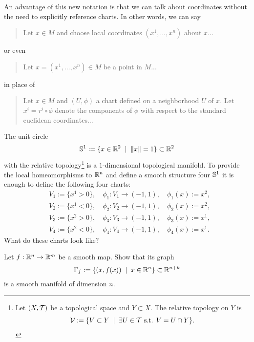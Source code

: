 An advantage of this new notation is that we can talk about coordinates without the need to explicitly reference charts. In other words, we can say
\begin{quote}
  Let $x\in M$ and choose local coordinates $(x^1, \ldots, x^n)$ about $x$...
\end{quote}
or even
\begin{quote}
  Let $x=(x^1, \ldots, x^n)\in M$ be a point in $M$...
\end{quote}
in place of
\begin{quote}
  Let $x \in M$ and $(U, \phi)$ a chart defined on a neighborhood $U$ of $x$. Let $x^i = r^i \circ\phi$ denote the components of $\phi$ with respect to the standard euclidean coordinates...
\end{quote}

\begin{ex}\label{ex:S1emb}
  The unit circle
  \begin{equation}
    \mathbb{S}^1 := \{x\in\mathbb{R}^2 \;\mid\; \|x\|=1\}\subset\mathbb{R}^2
  \end{equation}
  with the relative topology\footnote{Let $(X,\mathcal{T})$ be a topological space and $Y\subset X$. The relative topology on $Y$ is \begin{equation}\mathcal{V}:=\{V\subset Y\;\mid\;\exists U\in\mathcal{T} \mbox{ s.t. } V = U \cap Y\}.\end{equation}} is a $1$-dimensional topological manifold.
  To provide the local homeomorphisms to $\mathbb{R}^n$ and define a smooth structure four $\mathbb{S}^1$ it is enough to define the following four charts:
  \begin{equation}
    \begin{aligned}
      &V_1 := \{ x^1 > 0 \},\quad \phi_1: V_1 \to (-1, 1), \quad \phi_1(x) := x^2,\\
      &V_2 := \{ x^1 < 0 \},\quad \phi_2: V_2 \to (-1, 1), \quad \phi_2(x) := x^2,\\
      &V_3 := \{ x^2 > 0 \},\quad \phi_3: V_3 \to (-1, 1), \quad \phi_3(x) := x^1,\\
      &V_4 := \{ x^2 < 0 \},\quad \phi_4: V_4 \to (-1, 1), \quad \phi_4(x) := x^1.
    \end{aligned}
  \end{equation}
  What do these charts look like?
\end{ex}

\begin{exe}
  Let $f: \mathbb{R}^n \to \mathbb{R}^m$ be a smooth map.
  Show that its graph
  \begin{equation}
    \Gamma_f := \{(x, f(x)) \;\mid\; x\in\mathbb{R}^n\} \subset\mathbb{R}^{n+k}
  \end{equation}
  is a smooth manifold of dimension $n$.
\end{exe}

